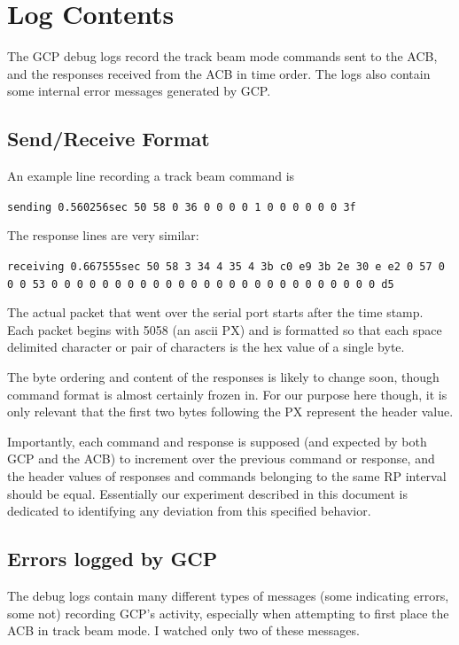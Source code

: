 \documentclass[12pt]{article}
\begin{document}
\section{Log Contents}

The GCP debug logs record the track beam mode commands sent to the ACB, and the responses received from the ACB in time order. The logs also contain some internal error messages generated by GCP.

\subsection{Send/Receive Format}

An example line recording a track beam command is 
\begin{center}
\texttt{sending 0.560256sec 50 58 0 36 0 0 0 0 1 0 0 0 0 0 0 3f}
\end{center}
The response lines are very similar:
\begin{center}
\texttt{receiving 0.667555sec 50 58 3 34 4 35 4 3b c0 e9 3b 2e 30 e e2 0 57 0 0 0 53 0 0 0 0 0 0 0 0 0 0 0 0 0 0 0 0 0 0 0 0 0 0 0 0 0 0 d5 }
\end{center}

The actual packet that went over the serial port starts after the time stamp. Each packet begins with 5058 (an ascii PX) and is formatted so that each space delimited character or pair of characters is the hex value of a single byte.

The byte ordering and content of the responses is likely to change soon, though command format is almost certainly frozen in. For our purpose here though, it is only relevant that the first two bytes following the PX represent the header value.

Importantly, each command and response is supposed (and expected by both GCP and the ACB) to increment over the previous command or response, and the header values of responses and commands belonging to the same RP interval should be equal. Essentially our experiment described in this document is dedicated to identifying any deviation from this specified behavior.

\subsection{Errors logged by GCP}

The debug logs contain many different types of messages (some indicating errors, some not) recording GCP's activity, especially when attempting to first place the ACB in track beam mode. I watched only two of these messages.
\end{document}
